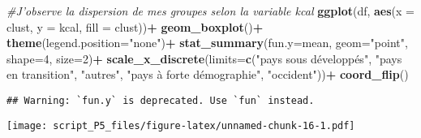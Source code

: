 \documentclass[
]{article}
\newenvironment{Shaded}{\begin{snugshade}}{\end{snugshade}}
\newcommand{\CommentTok}[1]{\textcolor[rgb]{0.56,0.35,0.01}{\textit{#1}}}
\newcommand{\DataTypeTok}[1]{\textcolor[rgb]{0.13,0.29,0.53}{#1}}
\newcommand{\DecValTok}[1]{\textcolor[rgb]{0.00,0.00,0.81}{#1}}
\newcommand{\KeywordTok}[1]{\textcolor[rgb]{0.13,0.29,0.53}{\textbf{#1}}}
\newcommand{\NormalTok}[1]{#1}
\newcommand{\OperatorTok}[1]{\textcolor[rgb]{0.81,0.36,0.00}{\textbf{#1}}}
\newcommand{\StringTok}[1]{\textcolor[rgb]{0.31,0.60,0.02}{#1}}
\begin{document}
\begin{Shaded}
\begin{Highlighting}[]
\CommentTok{#J'observe la dispersion de mes groupes selon la variable kcal}
\KeywordTok{ggplot}\NormalTok{(df, }\KeywordTok{aes}\NormalTok{(}\DataTypeTok{x =}\NormalTok{ clust, }\DataTypeTok{y =}\NormalTok{ kcal, }\DataTypeTok{fill =}\NormalTok{ clust))}\OperatorTok{+}
\StringTok{  }\KeywordTok{geom_boxplot}\NormalTok{()}\OperatorTok{+}\StringTok{ }
\StringTok{  }\KeywordTok{theme}\NormalTok{(}\DataTypeTok{legend.position=}\StringTok{"none"}\NormalTok{)}\OperatorTok{+}
\StringTok{  }\KeywordTok{stat_summary}\NormalTok{(}\DataTypeTok{fun.y=}\NormalTok{mean, }\DataTypeTok{geom=}\StringTok{"point"}\NormalTok{, }\DataTypeTok{shape=}\DecValTok{4}\NormalTok{, }\DataTypeTok{size=}\DecValTok{2}\NormalTok{)}\OperatorTok{+}
\StringTok{  }\KeywordTok{scale_x_discrete}\NormalTok{(}\DataTypeTok{limits=}\KeywordTok{c}\NormalTok{(}\StringTok{"pays sous développés"}\NormalTok{,}
                            \StringTok{"pays en transition"}\NormalTok{,}
                            \StringTok{"autres"}\NormalTok{,}
                            \StringTok{"pays à forte démographie"}\NormalTok{,}
                            \StringTok{"occident"}\NormalTok{))}\OperatorTok{+}\StringTok{ }\KeywordTok{coord_flip}\NormalTok{()}
\end{Highlighting}
\end{Shaded}

\begin{verbatim}
## Warning: `fun.y` is deprecated. Use `fun` instead.
\end{verbatim}

\texttt{[image: script\_P5\_files/figure-latex/unnamed-chunk-16-1.pdf]}
\end{document}
